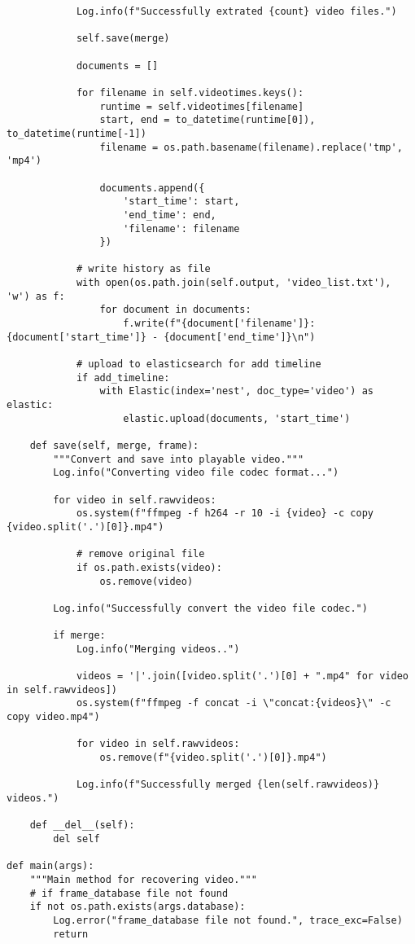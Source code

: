 \documentclass{easychair}
\begin{document}
\begin{enumerate}
\begin{lstlisting}
            Log.info(f"Successfully extrated {count} video files.")

            self.save(merge)

            documents = []

            for filename in self.videotimes.keys():
                runtime = self.videotimes[filename]
                start, end = to_datetime(runtime[0]), to_datetime(runtime[-1])
                filename = os.path.basename(filename).replace('tmp', 'mp4')

                documents.append({
                    'start_time': start,
                    'end_time': end,
                    'filename': filename
                })

            # write history as file
            with open(os.path.join(self.output, 'video_list.txt'), 'w') as f:
                for document in documents:
                    f.write(f"{document['filename']}: {document['start_time']} - {document['end_time']}\n")

            # upload to elasticsearch for add timeline
            if add_timeline:
                with Elastic(index='nest', doc_type='video') as elastic:
                    elastic.upload(documents, 'start_time')

    def save(self, merge, frame):
        """Convert and save into playable video."""
        Log.info("Converting video file codec format...")

        for video in self.rawvideos:
            os.system(f"ffmpeg -f h264 -r 10 -i {video} -c copy {video.split('.')[0]}.mp4")

            # remove original file
            if os.path.exists(video):
                os.remove(video)

        Log.info("Successfully convert the video file codec.")

        if merge:
            Log.info("Merging videos..")

            videos = '|'.join([video.split('.')[0] + ".mp4" for video in self.rawvideos])
            os.system(f"ffmpeg -f concat -i \"concat:{videos}\" -c copy video.mp4")

            for video in self.rawvideos:
                os.remove(f"{video.split('.')[0]}.mp4")

            Log.info(f"Successfully merged {len(self.rawvideos)} videos.")

    def __del__(self):
        del self

def main(args):
    """Main method for recovering video."""
    # if frame_database file not found
    if not os.path.exists(args.database):
        Log.error("frame_database file not found.", trace_exc=False)
        return


\end{lstlisting}
\end{enumerate}
\end{document}
